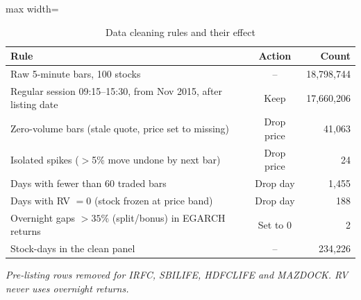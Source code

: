 \begin{table}[htbp]
\centering
\caption{Data cleaning rules and their effect}
\label{tab:cleaning}
\small
\begin{adjustbox}{max width=\textwidth}
\begin{tabular}{lcr}
\toprule
Rule & Action & Count \\
\midrule
Raw 5-minute bars, 100 stocks & -- & 18,798,744 \\
Regular session 09:15--15:30, from Nov 2015, after listing date & Keep & 17,660,206 \\
Zero-volume bars (stale quote, price set to missing) & Drop price & 41,063 \\
Isolated spikes ($>$5\% move undone by next bar) & Drop price & 24 \\
Days with fewer than 60 traded bars & Drop day & 1,455 \\
Days with RV $=0$ (stock frozen at price band) & Drop day & 188 \\
Overnight gaps $>35\%$ (split/bonus) in EGARCH returns & Set to 0 & 2 \\
Stock-days in the clean panel & -- & 234,226 \\
\bottomrule
\end{tabular}
\end{adjustbox}
\par\smallskip\parbox{0.95\textwidth}{\footnotesize\itshape Pre-listing rows removed for IRFC, SBILIFE, HDFCLIFE and MAZDOCK. RV never uses overnight returns.}
\end{table}
